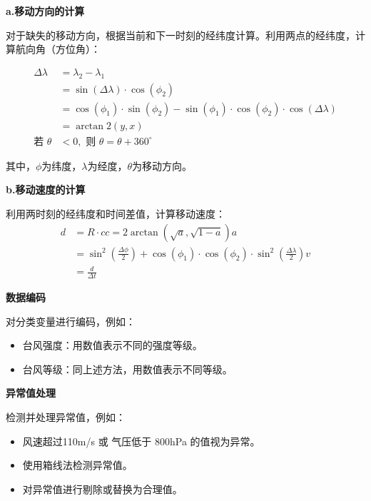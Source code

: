 \documentclass[withoutpreface,bwprint]{cumcmthesis}
\begin{document}
\textbf{a.移动方向的计算}

对于缺失的移动方向，根据当前和下一时刻的经纬度计算。利用两点的经纬度，计算航向角（方位角）：

\begin{align*}
\Delta \lambda &= \lambda_2 - \lambda_1 \\
 &= \sin(\Delta \lambda) \cdot \cos(\phi_2) \\
 &= \cos(\phi_1) \cdot \sin(\phi_2) - \sin(\phi_1) \cdot \cos(\phi_2) \cdot \cos(\Delta \lambda) \\
 &= \arctan2(y, x) \\
\text{若 } \theta &< 0, \text{ 则 } \theta = \theta + 360^\circ
\end{align*}

其中，$\phi$为纬度，$\lambda$为经度，$\theta$为移动方向。

\textbf{b.移动速度的计算}

利用两时刻的经纬度和时间差值，计算移动速度：
\begin{align*}
d &= R \cdot cc = 2 \arctan \left( \sqrt{a}, \sqrt{1 - a} \right)a \\
 &= \sin^2 \left( \frac{\Delta \phi}{2} \right) + \cos(\phi_1) \cdot \cos(\phi_2) \cdot \sin^2 \left( \frac{\Delta \lambda}{2} \right)v \\
 &= \frac{d}{\Delta t}
\end{align*}

\vspace{1em}
\textbf{数据编码}

对分类变量进行编码，例如：

\begin{itemize}
    \setlength{\itemindent}{2em}
    \item 台风强度：用数值表示不同的强度等级。

    \item 台风等级：同上述方法，用数值表示不同等级。
\end{itemize}

\vspace{1em}
\textbf{异常值处理}

检测并处理异常值，例如：

\begin{itemize}
    \setlength{\itemindent}{2em}
    \item 风速超过110m/s 或 气压低于 800hPa 的值视为异常。

    \item 使用箱线法检测异常值。

    \item 对异常值进行剔除或替换为合理值。
\end{itemize}
\end{document}
